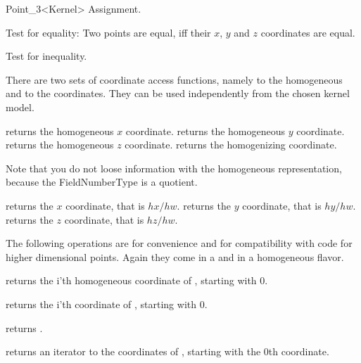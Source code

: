 \begin{ccRefClass} {Point_3<Kernel>}
\ccHidden {}
        {Assignment.}

       {Test for equality: Two points are equal, iff their $x$, $y$ and $z$
        coordinates are equal.}

       {Test for inequality.}

There are two sets of coordinate access functions, namely to the
homogeneous and to the  coordinates. They can be used
independently from the chosen kernel model.

       {returns the homogeneous $x$ coordinate.}
\ccGlue
{}
       {returns the homogeneous $y$ coordinate.}
\ccGlue
{}
       {returns the homogeneous $z$ coordinate.}
\ccGlue
{}
       {returns the homogenizing coordinate.}

Note that you do not loose information with the homogeneous
representation, because the FieldNumberType is a quotient.

       {returns the  $x$ coordinate, that is $hx/hw$.}
\ccGlue
{}
       {returns the  $y$ coordinate, that is $hy/hw$.}
\ccGlue
{}
       {returns the  $z$ coordinate, that is $hz/hw$.}

The following operations are for convenience and for compatibility
with code for higher dimensional points. Again they come in a
 and in a homogeneous flavor.

       {returns the i'th homogeneous coordinate of \ccVar, starting with 0.
        }

       {returns the i'th  coordinate of \ccVar, starting with 0.
        }

       {returns .
        }

       {returns an iterator to the  coordinates 
        of \ccVar, starting with the 0th coordinate.}


\end{ccRefClass}
